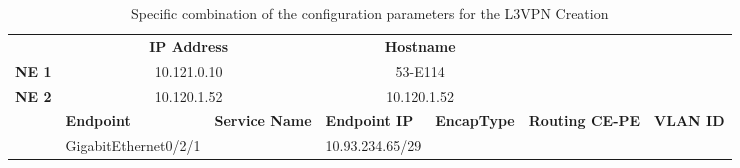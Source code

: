 \documentclass[a4paper,fleqn]{cas-dc}
\begin{document}
\begin{table}[]
\caption{Specific combination of the configuration parameters for the L3VPN Creation}
\begin{tabular}{c|c|c|l|c|cl}
\cline{2-5}
\multicolumn{1}{l|}{\cellcolor[HTML]{EFEFEF}}               & \multicolumn{2}{c|}{\cellcolor[HTML]{C0C0C0}\textbf{IP Address}}                                                                     & \multicolumn{2}{c|}{\cellcolor[HTML]{C0C0C0}\textbf{Hostname}}                          & \multicolumn{2}{l}{}                                                                                                                \\ \cline{1-5}
\multicolumn{1}{|l|}{\textbf{NE 1}}                         & \multicolumn{2}{c|}{10.121.0.10}                                                                                                     & \multicolumn{2}{c|}{53-E114}                                                            & \multicolumn{2}{l}{}                                                                                                                \\ \cline{1-5}
\multicolumn{1}{|l|}{\textbf{NE 2}}                         & \multicolumn{2}{c|}{10.120.1.52}                                                                                                     & \multicolumn{2}{c|}{10.120.1.52}                                                        & \multicolumn{2}{l}{\multirow{-3}{*}{}}                                                                                              \\ \hline
\rowcolor[HTML]{C0C0C0} 
\multicolumn{1}{|l|}{\cellcolor[HTML]{C0C0C0}\textbf{Test}} & \multicolumn{1}{l|}{\cellcolor[HTML]{C0C0C0}\textbf{Endpoint}} & \multicolumn{1}{l|}{\cellcolor[HTML]{C0C0C0}\textbf{Service Name}} & \textbf{Endpoint IP} & \multicolumn{1}{l|}{\cellcolor[HTML]{C0C0C0}\textbf{EncapType}} & \multicolumn{1}{l|}{\cellcolor[HTML]{C0C0C0}\textbf{Routing CE-PE}} & \multicolumn{1}{l|}{\cellcolor[HTML]{C0C0C0}\textbf{VLAN ID}} \\ \hline
\multicolumn{1}{|c|}{}                                      & GigabitEthernet0/2/1                                            &                                                                    & 10.93.234.65/29       &                                                                 & \multicolumn{1}{c|}{}                                               & \multicolumn{1}{l|}{}                                         \\ \cline{2-2} \cline{4-4}

\end{tabular}
\end{table}
\end{document}
